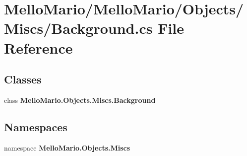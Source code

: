 \section{Mello\+Mario/\+Mello\+Mario/\+Objects/\+Miscs/\+Background.cs File Reference}
\label{Background_8cs}
\subsection*{Classes}
\begin{DoxyCompactItemize}
\item 
class \textbf{ Mello\+Mario.\+Objects.\+Miscs.\+Background}
\end{DoxyCompactItemize}
\subsection*{Namespaces}
\begin{DoxyCompactItemize}
\item 
namespace \textbf{ Mello\+Mario.\+Objects.\+Miscs}
\end{DoxyCompactItemize}
